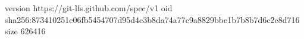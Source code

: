 version https://git-lfs.github.com/spec/v1
oid sha256:873410251c06fb5454707d95d4c3b8da74a77c9a8829bbe1b7b8b7d6c2e8d716
size 626416
